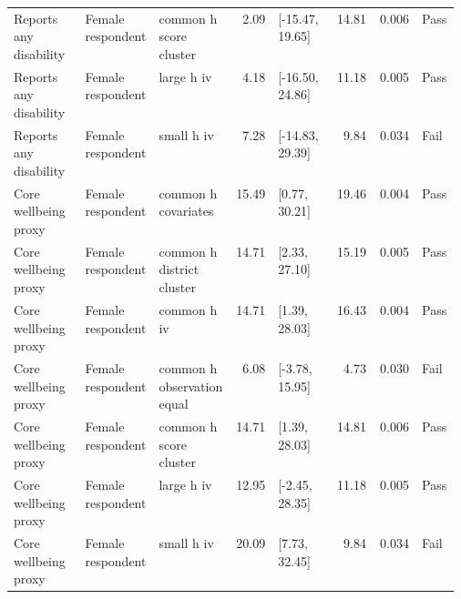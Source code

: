 \begin{longtable}{@{}p{0.16\linewidth}p{0.14\linewidth}p{0.14\linewidth}rp{0.13\linewidth}rrl@{}}
Reports any disability & Female respondent & common h score cluster & 2.09 & [-15.47, 19.65] & 14.81 & 0.006 & Pass \\
Reports any disability & Female respondent & large h iv & 4.18 & [-16.50, 24.86] & 11.18 & 0.005 & Pass \\
Reports any disability & Female respondent & small h iv & 7.28 & [-14.83, 29.39] & 9.84 & 0.034 & Fail \\
Core wellbeing proxy & Female respondent & common h covariates & 15.49 & [0.77, 30.21] & 19.46 & 0.004 & Pass \\
Core wellbeing proxy & Female respondent & common h district cluster & 14.71 & [2.33, 27.10] & 15.19 & 0.005 & Pass \\
Core wellbeing proxy & Female respondent & common h iv & 14.71 & [1.39, 28.03] & 16.43 & 0.004 & Pass \\
Core wellbeing proxy & Female respondent & common h observation equal & 6.08 & [-3.78, 15.95] & 4.73 & 0.030 & Fail \\
Core wellbeing proxy & Female respondent & common h score cluster & 14.71 & [1.39, 28.03] & 14.81 & 0.006 & Pass \\
Core wellbeing proxy & Female respondent & large h iv & 12.95 & [-2.45, 28.35] & 11.18 & 0.005 & Pass \\
Core wellbeing proxy & Female respondent & small h iv & 20.09 & [7.73, 32.45] & 9.84 & 0.034 & Fail \\
\end{longtable}
\endgroup
